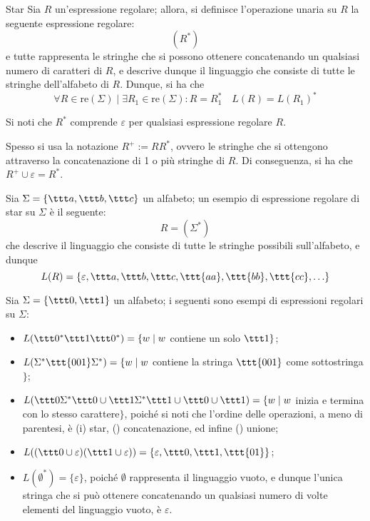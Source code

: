 \documentclass[a4paper, 12pt]{report}
\begin{document}
    \begin{frameddefn}{Star}
        Sia $R$ un'espressione regolare; allora, si definisce l'operazione unaria  su $R$ la seguente espressione regolare: $$(R^*)$$ e tutte rappresenta le stringhe che si possono ottenere concatenando un qualsiasi numero di caratteri di $R$, e descrive dunque il linguaggio che consiste di tutte le stringhe dell'alfabeto di $R$. Dunque, si ha che $$\forall R \in \mathrm{re}(\Sigma) \mid \exists R_1 \in \mathrm{re}(\Sigma) : R = R_1^* \quad L(R) = L(R_1)^*$$

        Si noti che $R^*$ comprende $\varepsilon$ per qualsiasi espressione regolare $R$.

        Spesso si usa la notazione $R^+ := RR^*$, ovvero le stringhe che si ottengono attraverso la concatenazione di 1 o più stringhe di $R$. Di conseguenza, si ha che $R^+ \cup \varepsilon = R^*$.
    \end{frameddefn}

    \begin{example}[Star]
        Sia $\Sigma = \{\ttt a, \ttt b, \ttt c\}$ un alfabeto; un esempio di espressione regolare di star su $\Sigma$ è il seguente: $$R = (\Sigma^*)$$ che descrive il linguaggio che consiste di tutte le stringhe possibili sull'alfabeto, e dunque $$L(R) = \{\varepsilon, \ttt a, \ttt b, \ttt c, \ttt{aa}, \ttt{bb}, \ttt{cc}, \ldots\}$$
    \end{example}

    \begin{example}
        Sia $\Sigma = \{\ttt 0, \ttt 1\}$ un alfabeto; i seguenti sono esempi di espressioni regolari su $\Sigma$:
        
        \begin{itemize}
            \item $L(\ttt 0 ^* \ttt 1 \ttt 0 ^*) = \{w \mid w$ contiene un solo $\ttt 1 \}$;
            \item $L(\Sigma ^* \ttt{001} \Sigma ^*) = \{ w \mid w$ contiene la stringa $\ttt{001}$ come sottostringa$\}$;
            \item $L(\ttt 0 \Sigma ^* \ttt 0 \cup \ttt 1 \Sigma ^* \ttt 1 \cup \ttt 0 \cup \ttt 1) = \{w \mid w$ inizia e termina con lo stesso carattere$\}$, poiché si noti che l'ordine delle operazioni, a meno di parentesi, è (\tit i) star, () concatenazione, ed infine () unione;
            \item $L((\ttt 0 \cup \varepsilon) (\ttt 1 \cup \varepsilon)) = \{\varepsilon, \ttt 0, \ttt 1, \ttt{01}\}$;
            \item $L(\emptyset ^*) = \{ \varepsilon \}$, poiché $\emptyset$ rappresenta il linguaggio vuoto, e dunque l'unica stringa che si può ottenere concatenando un qualsiasi numero di volte elementi del linguaggio vuoto, è $\varepsilon$.
        \end{itemize}
    \end{example}
\end{document}
